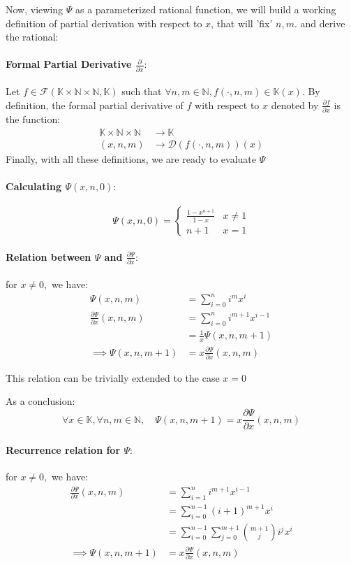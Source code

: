 \documentclass[]{article}
\begin{document}
Now, viewing $\Psi$ as a parameterized rational function, we will build a working definition of partial derivation with respect to $x$, that will 'fix' $n,m.$ and derive the rational:
\paragraph{Formal Partial Derivative $\frac{\partial}{\partial x}:$ } Let $f\in\mathcal{F}(\mathbb{K}\times\mathbb{N}\times\mathbb{N},\mathbb{K})$ such that $\forall n,m\in\mathbb{N}, f(\cdot,n,m)\in\mathbb{K}(x).$ By definition, the formal partial derivative of $f$ with respect to $x$ denoted by $\frac{\partial f}{\partial x}$ is the function:
\begin{align*}
	\mathbb{K}\times \mathbb{N}\times \mathbb{N}&\rightarrow \mathbb{K}\\
	(x,n,m) & \rightarrow \mathcal{D}(f(\cdot,n,m))(x)
\end{align*}
Finally, with all these definitions, we are ready to evaluate $\Psi$
\paragraph{Calculating $\Psi(x,n,0):$}
$$
\boxed{\Psi(x,n,0)=\begin{cases}
	\frac{1-x^{n+1}}{1-x} & x\neq 1 \\
	n+1 & x =1
\end{cases}}
$$
\paragraph{Relation between $\Psi$ and $\frac{\partial \Psi}{\partial x}:$}
for $x\neq 0,$ we have:
\begin{align*}
	\Psi(x,n,m)&=\sum_{i=0}^ni^mx^i\\
	\frac{\partial \Psi}{\partial x}(x,n,m)&=\sum_{i=0}^ni^{m+1}x^{i-1}\\
	&=\frac{1}{x}\Psi(x,n,m+1) \\
	\implies \Psi(x,n,m+1)&=x\frac{\partial \Psi}{\partial x}(x,n,m)
\end{align*}

This relation can be trivially extended to the case $x=0$

As a conclusion:
$$
\boxed{\forall x \in\mathbb{K},\forall n,m\in\mathbb{N},\quad \Psi(x,n,m+1)=x\frac{\partial \Psi}{\partial x}(x,n,m)}
$$

\paragraph{Recurrence relation for $\Psi:$}
for $x\neq 0,$ we have:
\begin{align*}
	\frac{\partial \Psi}{\partial x}(x,n,m)&=\sum_{i=1}^ni^{m+1}x^{i-1}\\
&=\sum_{i=0}^{n-1}(i+1)^{m+1}x^{i}\\
&=\sum_{i=0}^{n-1}\sum_{j=0}^{m+1}{m+1 \choose j}i^{j}x^i\\
	\implies \Psi(x,n,m+1)&=x\frac{\partial \Psi}{\partial x}(x,n,m)
\end{align*}
\end{document}
